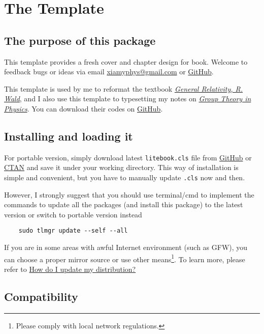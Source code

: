 \chapter{The  Template}

\section{The purpose of this package}

This template provides a fresh cover and chapter design for book. Welcome to feedback bugs or ideas via email \href{mailto:xiamyphys@gmail.com}{\ttfamily xiamyphys@gmail.com} or \href{https://github.com/xiamyphys/litebook}{GitHub}.

This template is used by me to reformat the textbook \href{https://github.com/xiamyphys/LaTeX-General-Relativity-R.Wald}{\emph{General Relativity, R. Wald}}, and I also use this template to typesetting my notes on \href{https://github.com/xiamyphys/Group-Theory-in-Physics}{\emph{Group Theory in Physics}}. You can download their codes on \href{https://github.com/xiamyphys}{GitHub}.

\section{Installing  and loading it}

For portable version, simply download latest \verb|litebook.cls| file from \href{https://github.com/xiamyphys/LiteBook}{GitHub} or \href{https://ctan.org/pkg/litebook}{CTAN} and save it under your working directory. This way of installation is simple and convenient, but you have to manually update \verb|.cls| now and then.

However, I strongly suggest that you should use terminal/cmd to implement the commands to update all the packages (and install this package) to the latest version or switch to portable version instead
\begin{verbatim}
    sudo tlmgr update --self --all
\end{verbatim}

If you are in some areas with awful Internet environment (such as GFW), you can choose a proper mirror source or use other means\footnote{Please comply with local network regulations.}. To learn more, please refer to \href{https://tex.stackexchange.com/questions/55437/how-do-i-update-my-tex-distribution}{How do I update my  distribution?}

\section{Compatibility}


